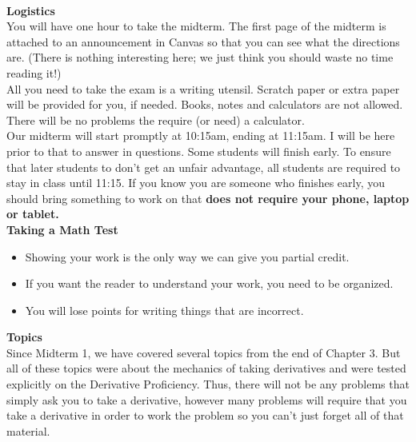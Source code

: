 \documentclass[11pt,fleqn]{article}
\begin{document}
\renewcommand{\headrulewidth}{0pt}
\newcommand{\blank}[1]{\rule{#1}{0.75pt}}
\newcommand{\bc}{\begin{center}}
\newcommand{\ec}{\end{center}}
\renewcommand{\d}{\displaystyle}

\vspace*{-0.7in}

\begin{center}
  \large
  \\
\end{center}
\noindent\textbf{Logistics}\\

You will have one hour to take the midterm. The first page of the midterm is attached to an announcement in Canvas so that you can see what the directions are. (There is nothing interesting here; we just think you should waste no time reading it!)\\

All you need to take the exam is a writing utensil. Scratch paper or extra paper will be provided for you, if needed. Books, notes and calculators are not allowed. There will be no problems the require (or need) a calculator. \\

Our midterm will start promptly at 10:15am, ending at 11:15am. I will be here prior to that to answer in questions. Some students will finish early. To ensure that later students to don't get an unfair advantage, all students are required to stay in class until 11:15. If you know you are someone who finishes early, you should bring something to work on that \textbf{does not require your phone, laptop or tablet.}\\

\noindent\textbf{Taking a Math Test}\\

\begin{itemize}
\item Showing your work is the only way we can give you partial credit.
\item If you want the reader to understand your work, you need to be organized.
\item You will lose points for writing things that are incorrect.
\end{itemize}


\noindent\textbf{Topics}\\

\noindent Since Midterm 1, we have covered several topics from the end of Chapter 3. But all of these topics were about the mechanics of taking derivatives and were tested explicitly on the Derivative Proficiency. Thus, there will not be any problems that simply ask you to take a derivative, however many problems will require that you take a derivative in order to work the problem so you can't just forget all of that material.\\ 
\end{document}
